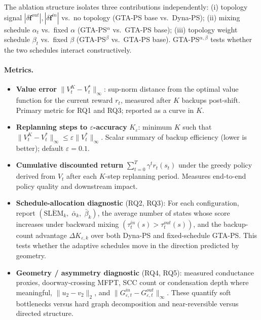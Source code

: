 \documentclass[10pt,a4paper]{article}
\begin{document}
The ablation structure isolates three contributions independently:
(i) topology signal $|\delta\mathbf{f}^{out}|,|\delta\mathbf{f}^{in}|$ vs.\ no topology
(GTA-PS base vs.\ Dyna-PS);
(ii) mixing schedule $\alpha_t$ vs.\ fixed $\alpha$
(GTA-PS$^{\alpha}$ vs.\ GTA-PS base);
(iii) topology weight schedule $\beta_t$ vs.\ fixed $\beta$
(GTA-PS$^{\beta}$ vs.\ GTA-PS base).
GTA-PS$^{\alpha,\beta}$ tests whether the two schedules interact constructively.


\paragraph{Metrics.}
\begin{itemize}\setlength\itemsep{2pt}
  \item \textbf{Value error} $\|V^K_t - V^*_t\|_\infty$: sup-norm distance from the optimal
    value function for the current reward $r_t$, measured after $K$ backups post-shift.
    Primary metric for RQ1 and RQ3; reported as a curve in $K$.

  \item \textbf{Replanning steps to $\varepsilon$-accuracy} $K_\varepsilon$: minimum $K$ such
    that $\|V^K_t - V^*_t\|_\infty \leq \varepsilon\|V^*_t\|_\infty$.
    Scalar summary of backup efficiency (lower is better); default $\varepsilon = 0.1$.

  \item \textbf{Cumulative discounted return} $\sum_{t=0}^{T} \gamma^t r_t(s_t)$ under the
    greedy policy derived from $V_t$ after each $K$-step replanning period.
    Measures end-to-end policy quality and downstream impact.

  \item \textbf{Schedule-allocation diagnostic} (RQ2, RQ3): For each configuration, report
    $(\overline{\mathrm{SLEM}}_k,\; \bar{\alpha}_k,\; \bar{\beta}_k)$, the average number of states
    whose score increases under backward mixing $(\tau_t^{in}(s) > \tau_t^{out}(s))$, and the backup-count advantage
    $\Delta K_{\varepsilon,k}$ over both Dyna-PS and fixed-schedule GTA-PS.
    This tests whether the adaptive schedules move in the direction predicted by geometry.

  \item \textbf{Geometry / asymmetry diagnostic} (RQ4, RQ5): measured conductance proxies,
    doorway-crossing MFPT, SCC count or condensation depth where meaningful,
    $\|u_2-v_2\|_2$, and $\|G^{in}_{\varepsilon,t} - G^{out}_{\varepsilon,t}\|_\infty$.
    These quantify soft bottlenecks versus hard graph decomposition and near-reversible
    versus directed structure.


\end{itemize}
\end{document}
